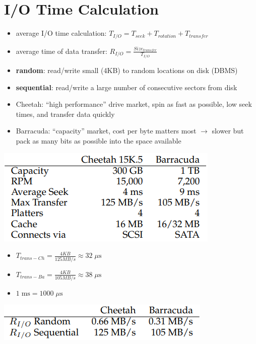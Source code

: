 \section*{I/O Time Calculation}
\begin{itemize}
\item average I/O time calculation: $T_{I/O} = T_{seek} + T_{rotation} + T_{transfer}$
\item average time of data transfer: $R_{I/O} = \frac{Size_{transfer}}{T_{I/O}}$
\item \textbf{random}: read/write small (4KB) to random locations on disk (DBMS)
\item \textbf{sequential}: read/write a large number of consecutive sectors from disk
\item Cheetah: ``high performance'' drive market, spin as fast as possible, low seek times, and transfer data quickly
\item Barracuda: ``capacity'' market, cost per byte matters most $\to$ slower but pack as many bits as possible into the space available
\end{itemize}
\begin{minipage}{.5\linewidth}
  \includegraphics[width=\linewidth]{imgs/disk_scsivssata}
\end{minipage}
\begin{minipage}{.5\linewidth}
  \flushleft
  \begin{itemize}
  \item $T_{trans-Ch} = \frac{4KB}{125MB/s} \approx 32\; \mu\text{s}$
  \item $T_{trans-Ba} = \frac{4KB}{105MB/s} \approx 38\; \mu\text{s}$
  \item $1\;\text{ms} = 1000\; \mu\text{s}$
  \end{itemize}
  \includegraphics[width=\linewidth]{imgs/disk_scsivssata1}
\end{minipage}

